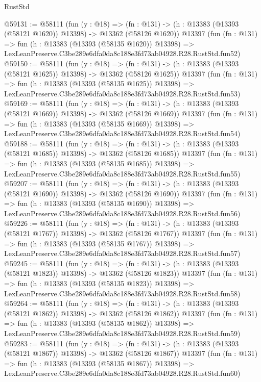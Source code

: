 \begin{lexlean}{RustStd}
\begin{coremodule}
@59131 := @58111
    (fun (y : @18) =>
    (fn : @131) -> (h : @13383 (@13393 (@58121 @1620)) @13398) -> @13362 (@58126 @1620))
    @13397
    (fun (fn : @131) =>
    fun (h : @13383 (@13393 (@58135 @1620)) @13398) =>
    LexLeanPreserve.C3be289e6dfa0da8c188e3fd73ab04928.R28.RustStd.fun52)
@59150 := @58111
    (fun (y : @18) =>
    (fn : @131) -> (h : @13383 (@13393 (@58121 @1625)) @13398) -> @13362 (@58126 @1625))
    @13397
    (fun (fn : @131) =>
    fun (h : @13383 (@13393 (@58135 @1625)) @13398) =>
    LexLeanPreserve.C3be289e6dfa0da8c188e3fd73ab04928.R28.RustStd.fun53)
@59169 := @58111
    (fun (y : @18) =>
    (fn : @131) -> (h : @13383 (@13393 (@58121 @1669)) @13398) -> @13362 (@58126 @1669))
    @13397
    (fun (fn : @131) =>
    fun (h : @13383 (@13393 (@58135 @1669)) @13398) =>
    LexLeanPreserve.C3be289e6dfa0da8c188e3fd73ab04928.R28.RustStd.fun54)
@59188 := @58111
    (fun (y : @18) =>
    (fn : @131) -> (h : @13383 (@13393 (@58121 @1685)) @13398) -> @13362 (@58126 @1685))
    @13397
    (fun (fn : @131) =>
    fun (h : @13383 (@13393 (@58135 @1685)) @13398) =>
    LexLeanPreserve.C3be289e6dfa0da8c188e3fd73ab04928.R28.RustStd.fun55)
@59207 := @58111
    (fun (y : @18) =>
    (fn : @131) -> (h : @13383 (@13393 (@58121 @1690)) @13398) -> @13362 (@58126 @1690))
    @13397
    (fun (fn : @131) =>
    fun (h : @13383 (@13393 (@58135 @1690)) @13398) =>
    LexLeanPreserve.C3be289e6dfa0da8c188e3fd73ab04928.R28.RustStd.fun56)
@59226 := @58111
    (fun (y : @18) =>
    (fn : @131) -> (h : @13383 (@13393 (@58121 @1767)) @13398) -> @13362 (@58126 @1767))
    @13397
    (fun (fn : @131) =>
    fun (h : @13383 (@13393 (@58135 @1767)) @13398) =>
    LexLeanPreserve.C3be289e6dfa0da8c188e3fd73ab04928.R28.RustStd.fun57)
@59245 := @58111
    (fun (y : @18) =>
    (fn : @131) -> (h : @13383 (@13393 (@58121 @1823)) @13398) -> @13362 (@58126 @1823))
    @13397
    (fun (fn : @131) =>
    fun (h : @13383 (@13393 (@58135 @1823)) @13398) =>
    LexLeanPreserve.C3be289e6dfa0da8c188e3fd73ab04928.R28.RustStd.fun58)
@59264 := @58111
    (fun (y : @18) =>
    (fn : @131) -> (h : @13383 (@13393 (@58121 @1862)) @13398) -> @13362 (@58126 @1862))
    @13397
    (fun (fn : @131) =>
    fun (h : @13383 (@13393 (@58135 @1862)) @13398) =>
    LexLeanPreserve.C3be289e6dfa0da8c188e3fd73ab04928.R28.RustStd.fun59)
@59283 := @58111
    (fun (y : @18) =>
    (fn : @131) -> (h : @13383 (@13393 (@58121 @1867)) @13398) -> @13362 (@58126 @1867))
    @13397
    (fun (fn : @131) =>
    fun (h : @13383 (@13393 (@58135 @1867)) @13398) =>
    LexLeanPreserve.C3be289e6dfa0da8c188e3fd73ab04928.R28.RustStd.fun60)

\end{coremodule}
\end{lexlean}
